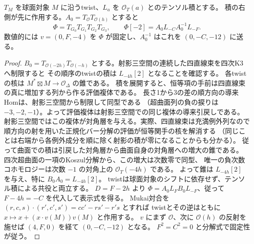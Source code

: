 \begin{proposition}\label{prop:quartic-k3-two-pencil-twists}
$T_M$ を球面対象 $M$ に沿うtwist、$L_a$ を $\mathcal O_T(a)$ とのテンソル積とする。
積の右側が先に作用する。$A_0=T_{\mathcal O}T_{\mathcal O(h)}$ とすると
\[
 \Phi=T_{G_0}T_{G_1}T_{G_2}T_{G_3},\qquad
 \Phi[-2]= A_0 L_{-C} A_0^{-1} L_{-F}.
\]
数値的には $v=(0,F,-4)$ を $\Phi$ が固定し、$A_0^{-1}$ はこれを $(0,-C,-12)$ に送る。
\end{proposition}
\begin{proof}
$B_0=T_{\mathcal O(-2h)}T_{\mathcal O(-h)}$ とする。射影三空間の連続した四直線束を四次K3へ制限すると
その順序のtwistの積は $L_{-4h}[2]$ となることを確認する。
各twistの核は $M^*\boxtimes M\to\mathcal O_\Delta$ の錐である。
積を展開すると、恒等項の手前は四直線束の真に増加する列から作る評価複体である。
長さ1から3の差の順方向の導来Homは、射影三空間から制限して同型である
（超曲面列の負の捩りは $-3,-2,-1$）。よって評価複体は射影三空間での同じ複体の導来引戻しである。
射影三空間ではこの複体が対角層を与える。実際、四直線束は充満例外列なので
順方向の射を用いた正規化バー分解の評価が恒等関手の核を解消する
（同じことは右端から各例外成分を順に除く射影の積が零になることからも分かる）。
従って曲面での積は引戻した対角層から曲面自身の対角層への増大の錐である。
四次超曲面の一項のKoszul分解から、この増大は次数零で同型、
唯一の負次数コホモロジーは次数 $-1$ の対角上の $\mathcal O_T(-4h)$ である。
よって錐は $L_{-4h}[2]$ を与え、特に $B_0 A_0=L_{-4h}[2]$。
twistは球面対象のシフトに依存せず、テンソル積による共役と両立する。
$D=F-2h$ より $\Phi=A_0 L_F B_0 L_{-F}$、従って $F-4h=-C$ を代入して表示式を得る。
Mukai対合を $(r,c,s)\cdot(r',c',s')=cc'-rs'-r's$ とすれば
twistとその逆はともに $x\mapsto x+(x\cdot v(M))v(M)$ と作用する。
$v$ にまず $\mathcal O$、次に $\mathcal O(h)$ の反射を施せば $(4,F,0)$ を経て $(0,-C,-12)$ となる。
$F^2=C^2=0$ と分解式で固定性が従う。
\end{proof}
